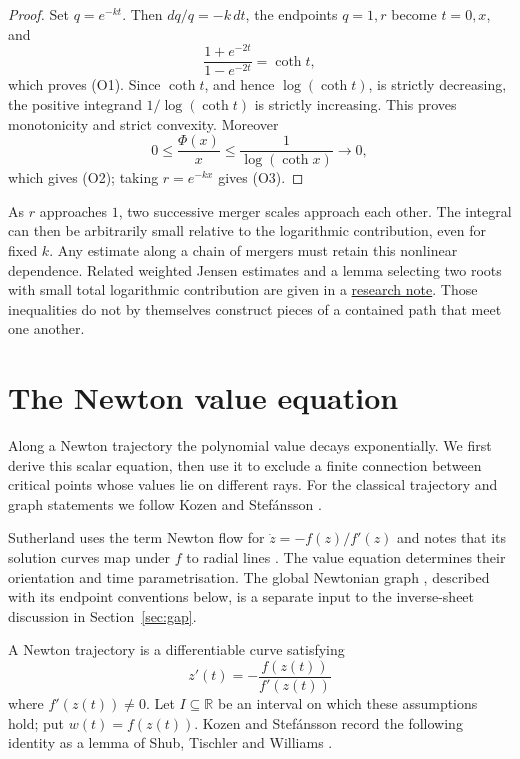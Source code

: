\begin{proof}
Set $q=e^{-kt}$.  Then $dq/q=-k\,dt$, the endpoints $q=1,r$ become
$t=0,x$, and
\[
 \frac{1+e^{-2t}}{1-e^{-2t}}=\coth t,
\]
which proves (O1).  Since $\coth t$, and hence $\log(\coth t)$, is strictly
decreasing, the positive integrand $1/\log(\coth t)$ is strictly increasing.
This proves monotonicity and strict convexity.  Moreover
\[
 0\le\frac{\Phi(x)}x\le\frac1{\log(\coth x)}\longrightarrow0,
\]
which gives (O2); taking $r=e^{-kx}$ gives (O3).
\end{proof}


As $r$ approaches $1$, two successive merger scales approach each other.
The integral can then be arbitrarily small relative to the logarithmic
contribution, even for
fixed $k$. Any estimate along a chain of mergers must retain this nonlinear
dependence. Related weighted Jensen estimates and a lemma selecting two
roots with small total logarithmic contribution are given in a
\href{https://github.com/wcook04/plectis-erdos/blob/f36a98bf3d3e6f65f1074e3b800e3293d5b8a51a/ErdosProblems/Erdos1041/AttachmentAgeLifetimeOrlicz.md}{research note}.
Those inequalities do not by themselves construct pieces of a contained
path that meet one another.


\section{The Newton value equation}\label{sec:newton}

Along a Newton trajectory the polynomial value decays exponentially.
We first derive this scalar equation, then use it to exclude a finite
connection between critical points whose values lie on different rays.
For the classical trajectory and graph statements we follow Kozen and
Stef\'ansson \cite[Lemmas~2.1--2.2 and \S2]{kozen-stefansson1997}.


Sutherland uses the term Newton flow for $\dot z=-f(z)/f'(z)$ and
notes that its solution curves map under $f$ to radial lines
\cite[p.~42]{sutherland1992}. The value equation
\cite[Lemma~2.1]{kozen-stefansson1997} determines their orientation and
time parametrisation. The global Newtonian graph
\cite[\S2]{kozen-stefansson1997}, described with its endpoint conventions
below, is a separate input to the inverse-sheet discussion in
Section~\ref{sec:gap}.

A Newton trajectory is a differentiable curve satisfying
\[
 z'(t)=-\frac{f(z(t))}{f'(z(t))}
\]
where $f'(z(t))\ne0$. Let $I\subseteq\mathbb R$ be an interval on
which these assumptions hold;
put $w(t)=f(z(t))$.  Kozen and Stef\'ansson record the following identity as
a lemma of Shub, Tischler and Williams \cite[Lemma~2.1]{kozen-stefansson1997}.

